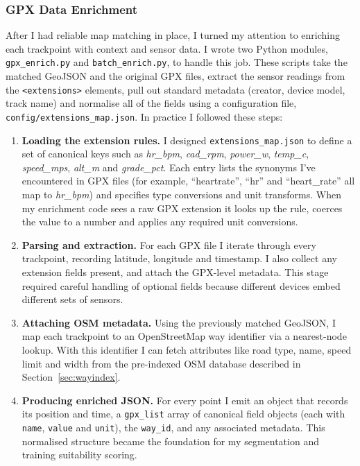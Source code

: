 \documentclass[11pt,a4paper]{report}
\begin{document}
\subsubsection{GPX Data Enrichment}\label{sec:gpx_enrich}
After I had reliable map matching in place, I turned my attention to enriching each trackpoint with context and sensor data. I wrote two Python modules, \texttt{gpx\_enrich.py} and \texttt{batch\_enrich.py}, to handle this job. These scripts take the matched GeoJSON and the original GPX files, extract the sensor readings from the \texttt{<extensions>} elements, pull out standard metadata (creator, device model, track name) and normalise all of the fields using a configuration file, \texttt{config/extensions\_map.json}. In practice I followed these steps:
\begin{enumerate}
	\item \textbf{Loading the extension rules.} I designed \texttt{extensions\_map.json} to define a set of canonical keys such as \emph{hr\_bpm}, \emph{cad\_rpm}, \emph{power\_w}, \emph{temp\_c}, \emph{speed\_mps}, \emph{alt\_m} and \emph{grade\_pct}. Each entry lists the synonyms I've encountered in GPX files (for example, ``heartrate'', ``hr'' and ``heart\_rate'' all map to \emph{hr\_bpm}) and specifies type conversions and unit transforms. When my enrichment code sees a raw GPX extension it looks up the rule, coerces the value to a number and applies any required unit conversions.
	\item \textbf{Parsing and extraction.} For each GPX file I iterate through every trackpoint, recording latitude, longitude and timestamp. I also collect any extension fields present, and attach the GPX-level metadata. This stage required careful handling of optional fields because different devices embed different sets of sensors.
	\item \textbf{Attaching OSM metadata.} Using the previously matched GeoJSON, I map each trackpoint to an OpenStreetMap way identifier via a nearest-node lookup. With this identifier I can fetch attributes like road type, name, speed limit and width from the pre-indexed OSM database described in Section~\ref{sec:wayindex}.
	\item \textbf{Producing enriched JSON.} For every point I emit an object that records its position and time, a \texttt{gpx\_list} array of canonical field objects (each with \texttt{name}, \texttt{value} and \texttt{unit}), the \texttt{way\_id}, and any associated metadata. This normalised structure became the foundation for my segmentation and training suitability scoring.
\end{enumerate}
\end{document}
